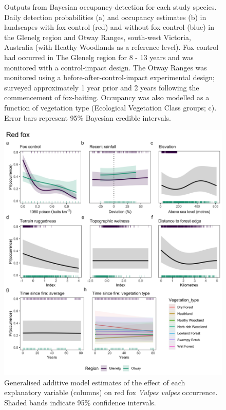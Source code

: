 \documentclass[11pt,a4paper,titlepage,twoside,openright]{style/unimelbthesis}
\begin{document}
\begin{mainmatter}
\begin{figure}
{}

\caption{Outputs from Bayesian occupancy-detection for each study species. Daily detection probabilities (a) and occupancy estimates (b) in landscapes with fox control (red) and without fox control (blue) in the Glenelg region and Otway Ranges, south-west Victoria, Australia (with Heathy Woodlands as a reference level). Fox control had occurred in The Glenelg region for 8 - 13 years and was monitored with a control-impact design. The Otway Ranges was monitored using a before-after-control-impact experimental design; surveyed approximately 1 year prior and 2 years following the commencement of fox-baiting. Occupancy was also modelled as a function of vegetation type (Ecological Vegetation Class groups; c). Error bars represent 95\% Bayesian credible intervals.}\label{fig:occ-det}
\end{figure}
\newpage
\begin{figure}

{\centering \includegraphics[width=1\linewidth]{figure/gams_fox} 

}

\caption{Generalised additive model estimates of the effect of each explanatory variable (columns) on red fox \textit{Vulpes vulpes} occurrence. Shaded bands indicate 95\% confidence intervals.}\label{fig:gams-occ-fox}
\end{figure}
\newpage
\begin{figure}


\end{figure}
\end{mainmatter}
\end{document}
